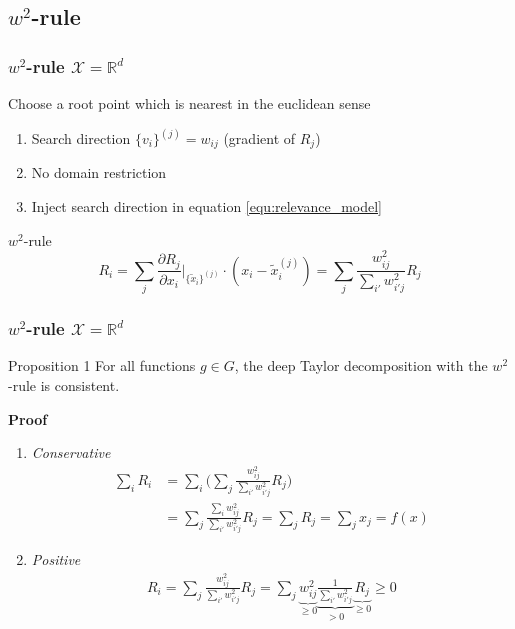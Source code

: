 \documentclass{beamer}
\begin{document}
\subsection[$w^2$-rule]{$w^2$-rule}


\begin{frame}
\frametitle{$w^2$-rule $\mathcal{X}=\mathbb{R}^d$}
Choose a root point which is nearest in the euclidean sense\\

\begin{enumerate}
	\item Search direction $\{v_i\}^{(j)} = w_{ij}$ (gradient of $R_j$)
	\item No domain restriction
	\item Inject search direction in equation \eqref{equ:relevance_model}
\end{enumerate}
\vspace{0.25cm}
\begin{block}{$w^2$-rule}
\begin{equation*}
R_i =\sum_j\frac{\partial R_j}{\partial x_i}\Big|_{\{\tilde{x}_i\}^{(j)}} \cdot (x_i - \tilde{x}_i^{(j)}) =  \sum_j\frac{w_{ij}^2}{\sum_{i'} w_{i'j}^2} R_j
\end{equation*}
\end{block}



\end{frame}



\begin{frame}
\frametitle{$w^2$-rule $\mathcal{X}=\mathbb{R}^d$}
\vspace{0.3cm}
\begin{block}{Proposition 1}
For all functions $g \in G$, the deep Taylor decomposition with the $w^2$-rule is consistent.
\end{block}
\textbf{Proof}\\
\begin{enumerate}
\item \textit{Conservative}
\begin{align*}
\sum_i R_i &= \sum_i\Big(\sum_j \frac{w_{ij}^2}{\sum_{i'}w_{i'j}^2}R_j\Big)\\
   		&= \sum_j \frac{\sum_i w_{ij}^2}{\sum_{i'} w_{i'j}^2}R_j = \sum_j R_j = \sum_j x_j = f(x)
\end{align*}
\item \textit{Positive}
\begin{align*}
R_i = \sum_j \frac{w_{ij}^2}{\sum_{i'} w_{i'j}^2}R_j = \sum_j \underbrace{w_{ij}^2}_{\geq 0}  \underbrace{\frac{1}{\sum_{i'} w_{i'j}^2}}_{>0}  \underbrace{R_j}_{\geq 0} \geq 0
\end{align*}
\end{enumerate}


\end{frame}
\end{document}
